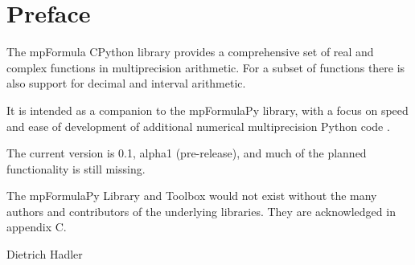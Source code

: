 \chapter{Preface}
\label{Preface} 

The mpFormula CPython library provides a comprehensive set of real and complex functions in multiprecision arithmetic. For a subset of functions there is also support for decimal and interval arithmetic. 

\vpara
It is intended as a companion to the mpFormulaPy library, with a focus on speed and ease of development of additional numerical multiprecision Python code .

 

\vpara
The current version is 0.1, alpha1 (pre-release), and much of the planned functionality is still missing.


\vpara
The mpFormulaPy Library and Toolbox would not exist without the many authors and contributors of the underlying libraries. They are acknowledged in appendix C.


\vspace{0.6cm}
Dietrich Hadler
